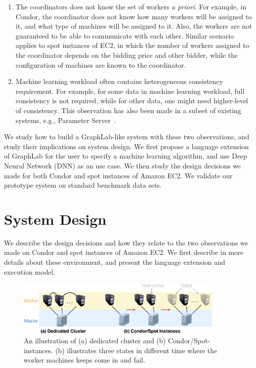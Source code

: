 \documentclass[11pt]{article}
\begin{document}
\begin{enumerate}
\item The coordinators does not know the set of workers
{\em a priori}. For example, in Condor, the coordinator
does not know how many workers will be assigned to it, and
what type of machines will be assigned to it. Also, the
workers are not guaranteed to be able to communicate with each
other. Similar scenario applies to spot instances
of EC2, in which the number of workers assigned to the
coordinator depends on the bidding price and other bidder, while
the configuration of machines are known to the coordinator.
\item Machine learning workload often contains heterogeneous
consistency requirement. For example, for some data
in machine learning workload, full consistency is not required,
while for other data, one might need higher-level of consistency.
This observation has also been made in a subset of
existing systems, e.g., Parameter Server~\cite{Li:2014:OSDI}.
\end{enumerate}

We study how to build a GraphLab-like system with these two
observations, and study their implications on system design.
We first propose a language extension of GraphLab for the
user to specify a machine learning algorithm, and use
Deep Neural Network (DNN) as an use case. We then study
the design decisions we made for both Condor and spot
instances of Amazon EC2. We validate our prototype system
on standard benchmark data sets.

\section{System Design}

We describe the design decisions and how they relate to
the two observations we made on Condor and spot
instances of Amazon EC2. We first describe in more details
about these environment, and present the language extension
and execution model.

\begin{figure}[t]
\centering
\includegraphics[width=0.9\textwidth]{figures/env-crop}
\caption{An illustration of (a) dedicated cluster and (b) Condor/Spot-instances. (b) illustrates three states in different time where the worker machines keeps come in and fail.}
\label{fig:env}
\end{figure}
\end{document}
